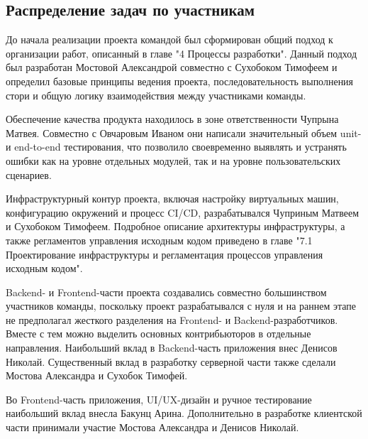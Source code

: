 \subsection{Распределение задач по участникам}

До начала реализации проекта командой был сформирован общий подход к организации работ, описанный в главе "4 Процессы разработки". Данный подход был разработан Мостовой Александрой совместно с Сухобоком Тимофеем и определил базовые принципы ведения проекта, последовательность выполнения стори и общую логику взаимодействия между участниками команды.

Обеспечение качества продукта находилось в зоне ответственности Чупрына Матвея. Совместно с Овчаровым Иваном они написали значительный объем unit- и end-to-end тестирования, что позволило своевременно выявлять и устранять ошибки как на уровне отдельных модулей, так и на уровне пользовательских сценариев.

Инфраструктурный контур проекта, включая настройку виртуальных машин, конфигурацию окружений и процесс CI/CD, разрабатывался Чуприным Матвеем и Сухобоком Тимофеем. Подробное описание архитектуры инфраструктуры, а также регламентов управления исходным кодом приведено в главе "7.1 Проектирование инфраструктуры и регламентация процессов управления исходным кодом".

Backend- и Frontend-части проекта создавались совместно большинством участников команды, поскольку проект разрабатывался с нуля и на раннем этапе не предполагал жесткого разделения на Frontend- и Backend-разработчиков. Вместе с тем можно выделить основных контрибьюторов в отдельные направления. Наибольший вклад в Backend-часть приложения внес Денисов Николай. Существенный вклад в разработку серверной части также сделали Мостова Александра и Сухобок Тимофей.

Во Frontend-часть приложения, UI/UX-дизайн и ручное тестирование наибольший вклад внесла Бакунц Арина. Дополнительно в разработке клиентской части принимали участие Мостова Александра и Денисов Николай.



